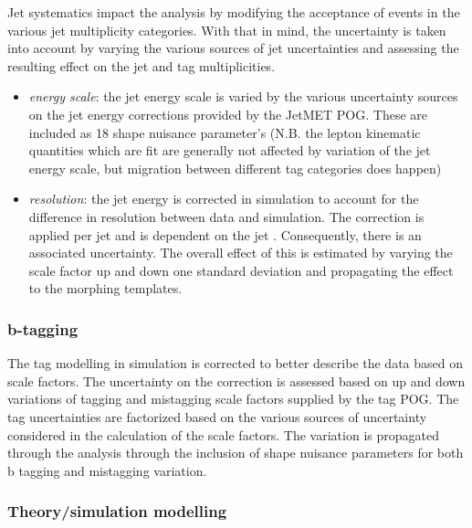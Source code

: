     Jet systematics impact the analysis by modifying the acceptance of
    events in the various jet multiplicity categories.  With that in
    mind, the uncertainty is taken into account by varying the various
    sources of jet uncertainties and assessing the resulting effect on
    the jet and \PQb tag multiplicities.

    \begin{itemize}
        \item \textit{energy scale}: the jet energy scale is varied by
            the various uncertainty sources on the jet energy
            corrections provided by the JetMET POG.  These are included
            as 18 shape nuisance parameter's (N.B. the lepton kinematic quantities
            which are fit are generally not affected by variation of the
            jet energy scale, but migration between different \PQb tag
            categories does happen)
        \item \textit{resolution}: the jet energy is corrected in
            simulation to account for the difference in resolution
            between data and simulation.  The correction is applied per
            jet and is dependent on the jet \pt.  Consequently, there is
            an associated uncertainty.  The overall effect of this is
            estimated by varying the scale factor up and down one
            standard deviation and propagating the effect to the
            morphing templates.
    \end{itemize}

\subsubsection{b-tagging}
    
The \PQb tag modelling in simulation is corrected to better describe the
data based on scale factors.  The uncertainty on the correction is
assessed based on up and down variations of \PQb tagging and mistagging
scale factors supplied by the \PQb tag POG.  The \PQb tag uncertainties are
factorized based on the various sources of uncertainty considered in the
calculation of the scale factors.  The variation is propagated through
the analysis through the inclusion of shape nuisance parameters for both
b tagging and mistagging variation.




\subsubsection{Theory/simulation modelling}

